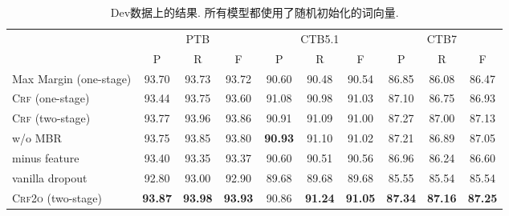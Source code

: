 \begin{table*}[tb!]
    \centering
    \caption{Dev数据上的结果. 所有模型都使用了随机初始化的词向量.}
    \begin{tabularx}{\textwidth}{lccccccccc}
        \toprule
                                   & \multicolumn{3}{c}{PTB} & \multicolumn{3}{c}{CTB5.1} & \multicolumn{3}{c}{CTB7}                                                                                                       \\
                                   & P                       & R                          & F                        & P              & R              & F              & P              & R              & F              \\
        \midrule
        Max Margin (one-stage)     & 93.70                   & 93.73                      & 93.72                    & 90.60          & 90.48          & 90.54          & 86.85          & 86.08          & 86.47          \\
        \textsc{Crf} (one-stage)   & 93.44                   & 93.75                      & 93.60                    & 91.08          & 90.98          & 91.03          & 87.10          & 86.75          & 86.93          \\[3pt]
        \textsc{Crf} (two-stage)   & 93.77                   & 93.96                      & 93.86                    & 90.91          & 91.09          & 91.00          & 87.27          & 87.00          & 87.13          \\
        \qquad w/o MBR             & 93.75                   & 93.85                      & 93.80                    & \textbf{90.93} & 91.10          & 91.02          & 87.21          & 86.89          & 87.05          \\
        \qquad minus feature       & 93.40                   & 93.35                      & 93.37                    & 90.60          & 90.51          & 90.56          & 86.96          & 86.24          & 86.60          \\
        \qquad vanilla dropout     & 92.80                   & 93.00                      & 92.90                    & 89.68          & 89.68          & 89.68          & 85.55          & 85.54          & 85.54          \\
        \textsc{Crf2o} (two-stage) & \textbf{93.87}          & \textbf{93.98}             & \textbf{93.93}           & 90.86          & \textbf{91.24} & \textbf{91.05} & \textbf{87.34} & \textbf{87.16} & \textbf{87.25} \\

        \bottomrule
    \end{tabularx}
    \label{table:con-dev}
\end{table*}